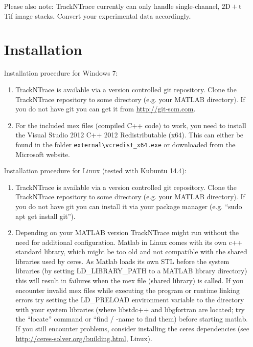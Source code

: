 \documentclass[11pt,onside]{report}
\numberwithin{equation}{chapter}
\begin{document}
Please also note: TrackNTrace currently can only handle single-channel, $\mathrm{2D}+\mathrm{t}$ Tif image stacks. Convert your experimental data accordingly. \clearpage%

\tableofcontents

\section{Installation}\label{sec:install}
Installation procedure for Windows 7:
\begin{enumerate}
\item TrackNTrace is available via a version controlled git repository. Clone the TrackNTrace repository to some directory (e.g. your MATLAB directory). If you do not have git you can get it from \url{http://git-scm.com}.
\item For the included mex files (compiled C++ code) to work, you need to install the Visual Studio 2012 C++ 2012 Redistributable (x64). This can either be found in the folder \texttt{external\textbackslash{}vcredist\_x64.exe} or downloaded from the Microsoft website.
\end{enumerate}

\noindent  Installation procedure for Linux (tested with Kubuntu 14.4):
\begin{enumerate}
\item TrackNTrace is available via a version controlled git repository. Clone the TrackNTrace repository to some directory (e.g. your MATLAB directory). If you do not have git you can install it via your package manager (e.g. ``sudo apt get install git'').
\item Depending on your MATLAB version TrackNTrace might run without the need for additional configuration.
Matlab in Linux comes with its own c++ standard library, which might be too old and not compatible with the shared libraries used by ceres. As Matlab loads its own STL before the system libraries (by setting LD\_LIBRARY\_PATH to a MATLAB library directory) this will result  in failures when the mex file (shared library) is called. If you encounter invalid mex files while executing the program or runtime linking errors try setting the LD\_PRELOAD environment variable to the directory with your system libraries (where libstdc++ and libgfortran are located; try the ``locate'' command or ``find / -name to find them) before starting matlab. If you still encounter problems, consider installing the ceres dependencies (see \url{http://ceres-solver.org/building.html}, Linux).
\end{enumerate}
\end{document}

